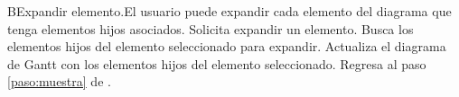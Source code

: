 
  \begin{UCtrayectoriaA}{B}{Expandir elemento.}{El usuario puede expandir cada elemento del diagrama que tenga elementos hijos asociados.}
    \UCpaso[\UCactor] Solicita expandir un elemento.
    \UCpaso Busca los elementos hijos del elemento seleccionado para expandir.
    \UCpaso Actualiza el diagrama de Gantt con los elementos hijos del elemento seleccionado.
    \UCpaso Regresa al paso \ref{paso:muestra} de .
  \end{UCtrayectoriaA}